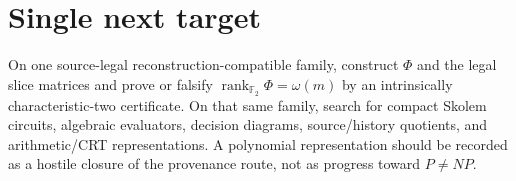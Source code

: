 \documentclass[11pt]{article}
\begin{document}
\section*{Single next target}
On one source-legal reconstruction-compatible family, construct \(\Phi\) and the legal
slice matrices and prove or falsify \(\operatorname{rank}_{\mathbb F_2}\Phi=\omega(m)\)
by an intrinsically characteristic-two certificate. On that same family, search for compact
Skolem circuits, algebraic evaluators, decision diagrams, source/history quotients, and
arithmetic/CRT representations. A polynomial representation should be recorded as a hostile
closure of the provenance route, not as progress toward \(P\neq NP\).

\end{document}

